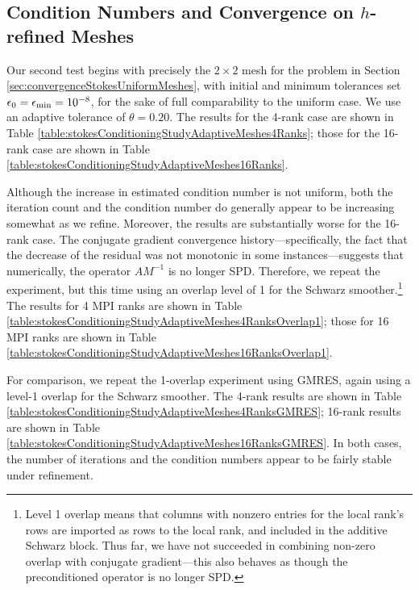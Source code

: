 \documentclass[11pt]{amsart}
\begin{document}
\subsection{Condition Numbers and Convergence on $h$-refined Meshes}
Our second test begins with precisely the $2 \times 2$ mesh for the problem in Section \ref{sec:convergenceStokesUniformMeshes}, with initial and minimum tolerances set $\epsilon_0 = \epsilon_{\rm min} = 10^{-8}$, for the sake of full comparability to the uniform case.  We use an adaptive tolerance of $\theta=0.20$.  The results for the 4-rank case are shown in Table \ref{table:stokesConditioningStudyAdaptiveMeshes4Ranks}; those for the 16-rank case are shown in Table \ref{table:stokesConditioningStudyAdaptiveMeshes16Ranks}.

Although the increase in estimated condition number is not uniform, both the iteration count and the condition number do generally appear to be increasing somewhat as we refine.  Moreover, the results are substantially worse for the 16-rank case.  The conjugate gradient convergence history---specifically, the fact that the decrease of the residual was not monotonic in some instances---suggests that numerically, the operator $A M^{-1}$ is no longer SPD.  Therefore, we repeat the experiment, but this time using an overlap level of 1 for the Schwarz smoother.\footnote{Level 1 overlap means that columns with nonzero entries for the local rank's rows are imported as rows to the local rank, and included in the additive Schwarz block.  Thus far, we have not succeeded in combining non-zero overlap with conjugate gradient---this also behaves as though the preconditioned operator is no longer SPD.}  The results for 4 MPI ranks are shown in Table \ref{table:stokesConditioningStudyAdaptiveMeshes4RanksOverlap1}; those for 16 MPI ranks are shown in Table \ref{table:stokesConditioningStudyAdaptiveMeshes16RanksOverlap1}.

For comparison, we repeat the 1-overlap experiment using GMRES, again using a level-1 overlap for the Schwarz smoother.  The 4-rank results are shown in Table \ref{table:stokesConditioningStudyAdaptiveMeshes4RanksGMRES}; 16-rank results are shown in Table \ref{table:stokesConditioningStudyAdaptiveMeshes16RanksGMRES}.  In both cases, the number of iterations and the condition numbers appear to be fairly stable under refinement.
\end{document}
